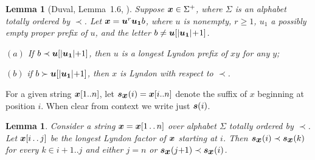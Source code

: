 \documentclass[10pt]{llncs}
\newtheorem{lemm}[thrm]{Lemma}
\newenvironment{my_itemize}{
\begin{itemize}
  \setlength{\itemsep}{1pt}
  \setlength{\parskip}{0pt}
  \setlength{\parsep}{0pt}}{\end{itemize}
}
\def\dd{\mathinner{\ldotp\ldotp}}
\def\s#1{\mbox{\boldmath $#1$}}
\def\+{\!+\!}
\begin{document}
\begin{lemm}[Duval, Lemma~1.6, \cite{D83}]\label{duval}
Suppose $\s{x} \in \Sigma^+$, where $\Sigma$
is an alphabet totally ordered by $\prec$.
Let $\s{x} = \s{u}^r\s{u_1}b$,
where \s{u} is nonempty, $r \ge 1$, \s{u_1} a possibly empty proper prefix of \s{u},
and the letter $b \ne \s{u}[|\s{u_1}|\+ 1]$.
\begin{my_itemize}
\item[$(a)$] If $b\prec \s{u}[|\s{u_1}|{+}1]$, then \s{u} is a longest Lyndon prefix
of \s{xy} for any \s{y};
\item[$(b)$] if $b\succ \s{u}[|\s{u_1}|{+}1]$, then \s{x} is Lyndon with respect to $\prec$.
\end{my_itemize}
\end{lemm}

For a given string $\s{x}[1..n]$, let $\s{s}_{\s{x}}(i) = \s{x}[i..n]$
denote the suffix of \s{x} beginning at position $i$.
When clear from context we write just $\s{s}(i)$.

\begin{lemm}\label{lemm-AB}
Consider a string $\s{x}=\s{x}[1\dd n]$ over alphabet $\Sigma$
totally ordered by $\prec$.
Let $\s{x}[i\dd j]$ be the longest
Lyndon factor of $\s{x}$ starting at $i$.
Then $\s{s}_{\s{x}}(i)\prec \s{s}_{\s{x}}(k)$ for every $k \in i\+ 1..j$
and either $j=n$  or $\s{s}_{\s{x}}(j{+}1) \prec \s{s}_{\s{x}}(i)$.
\end{lemm}
\end{document}
